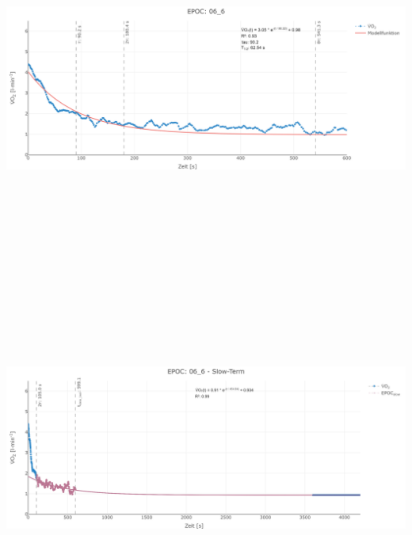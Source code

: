 \documentclass[
  letterpaper,
  DIV=11]{scrartcl}
\begin{document}
\includegraphics[width=11.45833in,height=4.6875in]{images/06_6_tau.png}
\includegraphics[width=11.45833in,height=4.6875in]{images/06_6_slow.png}
\end{document}
